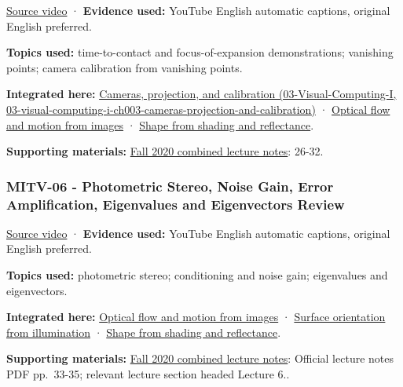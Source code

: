 \href{https://www.youtube.com/watch?v=SSlPV1iYjHw}{Source video} · \textbf{Evidence used:} YouTube English automatic captions, original English preferred.

\textbf{Topics used:} time-to-contact and focus-of-expansion demonstrations; vanishing points; camera calibration from vanishing points.

\textbf{Integrated here:} \href{../03-Visual-Computing-I/main.pdf\#nameddest=03-visual-computing-i-ch003-cameras-projection-and-calibration}{Cameras, projection, and calibration (03-Visual-Computing-I, 03-visual-computing-i-ch003-cameras-projection-and-calibration)} · \hyperref[04-visual-computing-ii-ch030-optical-flow-and-motion-from-images]{Optical flow and motion from images} · \hyperref[04-visual-computing-ii-ch032-shape-from-shading-and-reflectance]{Shape from shading and reflectance}.

\textbf{Supporting materials:} \href{https://ocw.mit.edu/courses/6-801-machine-vision-fall-2020/9ec44f69e72995c370b3797818ba01e6_MIT6_801F20_lectureNotes.pdf}{Fall 2020 combined lecture notes}: 26-32.

\subsubsection{MITV-06 - Photometric Stereo, Noise Gain, Error Amplification, Eigenvalues and Eigenvectors Review}\label{04-visual-computing-ii-ch036-mitv-06---photometric-stereo-noise-gain-error-amplification-eigenvalues-and-eigenvectors-review}

\href{https://www.youtube.com/watch?v=OOrT17RsVxE}{Source video} · \textbf{Evidence used:} YouTube English automatic captions, original English preferred.

\textbf{Topics used:} photometric stereo; conditioning and noise gain; eigenvalues and eigenvectors.

\textbf{Integrated here:} \hyperref[04-visual-computing-ii-ch030-optical-flow-and-motion-from-images]{Optical flow and motion from images} · \hyperref[04-visual-computing-ii-ch032-surface-orientation-from-illumination]{Surface orientation from illumination} · \hyperref[04-visual-computing-ii-ch032-shape-from-shading-and-reflectance]{Shape from shading and reflectance}.

\textbf{Supporting materials:} \href{https://ocw.mit.edu/courses/6-801-machine-vision-fall-2020/9ec44f69e72995c370b3797818ba01e6_MIT6_801F20_lectureNotes.pdf}{Fall 2020 combined lecture notes}: Official lecture notes PDF pp.~33-35; relevant lecture section headed Lecture 6..

